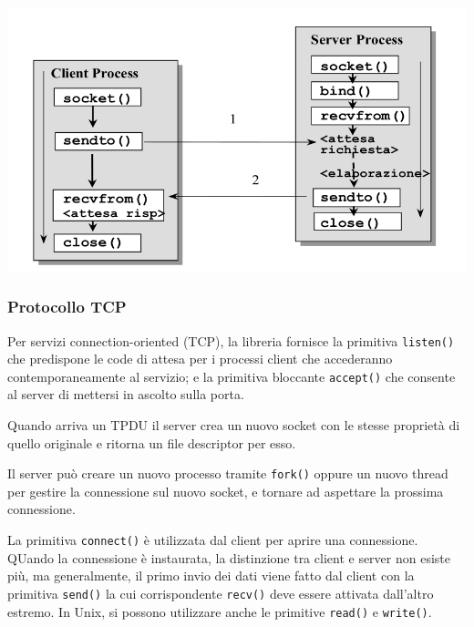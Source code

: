             \begin{center}
                \includegraphics[scale=0.38]{chapters/5/assets/schema_d.png}
            \end{center}

        \subsubsection{Protocollo TCP}
            Per servizi connection-oriented (TCP), la libreria fornisce la primitiva \verb:listen(): che predispone le code di attesa per i processi client che accederanno contemporaneamente al servizio; e la primitiva bloccante \verb:accept(): che consente al server di mettersi in ascolto sulla porta.
        
            Quando arriva un TPDU il server crea un nuovo socket con le stesse proprietà di quello originale e ritorna un file descriptor per esso.
        
            Il server può creare un nuovo processo tramite \verb:fork(): oppure un nuovo thread per gestire la connessione sul nuovo socket, e tornare ad aspettare la prossima connessione.
        
            La primitiva \verb:connect(): è utilizzata dal client per aprire una connessione. QUando la connessione è instaurata, la distinzione tra client e server non esiste più, ma generalmente, il primo invio dei dati viene fatto dal client con la primitiva \verb:send(): la cui corrispondente \verb:recv(): deve essere attivata dall'altro estremo. In Unix, si possono utilizzare anche le primitive \verb:read(): e \verb:write():.

